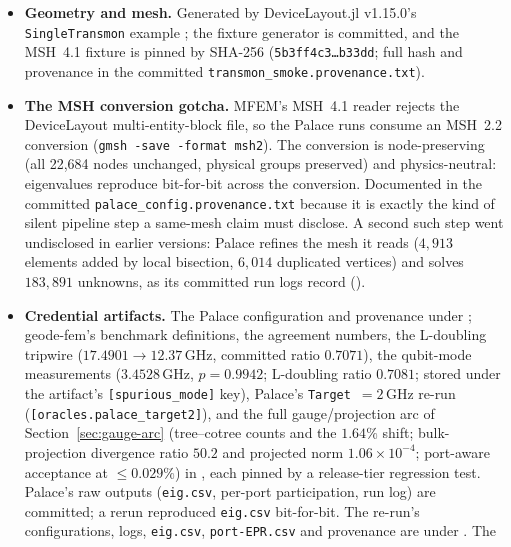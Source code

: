 \documentclass{anvil-paper}
\begin{document}
\begin{itemize}
  \item \textbf{Geometry and mesh.} Generated by DeviceLayout.jl
    v1.15.0's \texttt{SingleTransmon} example \citep{devicelayout}; the
    fixture generator is committed, and the MSH~4.1 fixture is pinned by
    SHA-256 (\texttt{5b3ff4c3\ldots{}b33dd}; full hash and provenance in
    the committed \texttt{transmon\_smoke.provenance.txt}).
  \item \textbf{The MSH conversion gotcha.} MFEM's MSH~4.1 reader
    rejects the DeviceLayout multi-entity-block file, so the Palace runs
    consume an MSH~2.2 conversion (\texttt{gmsh -save -format msh2}).
    The conversion is node-preserving (all 22{,}684 nodes unchanged,
    physical groups preserved) and physics-neutral: eigenvalues
    reproduce bit-for-bit across the conversion. Documented in the
    committed \texttt{palace\_config.provenance.txt} because it is
    exactly the kind of silent pipeline step a same-mesh claim must
    disclose. A second such step went undisclosed in earlier versions:
    Palace refines the mesh it reads ($4{,}913$ elements added by local
    bisection, $6{,}014$ duplicated vertices) and solves $183{,}891$
    unknowns, as its committed run logs record
    ().
  \item \textbf{Credential artifacts.} The Palace configuration and
    provenance under ;
    geode-fem's benchmark definitions, the agreement numbers, the
    L-doubling tripwire ($17.4901 \to 12.37$\,GHz, committed ratio
    $0.7071$), the qubit-mode measurements ($3.4528$\,GHz,
    $p = 0.9942$; L-doubling ratio $0.7081$; stored under the
    artifact's \texttt{[spurious\_mode]} key), Palace's
    \texttt{Target}~$= 2$\,GHz re-run
    (\texttt{[oracles.palace\_target2]}), and the full
    gauge/projection arc of Section~\ref{sec:gauge-arc}
    (tree--cotree counts and the $1.64\%$ shift; bulk-projection
    divergence ratio $50.2$ and projected norm $1.06\times10^{-4}$;
    port-aware acceptance at $\leq 0.029\%$) in
    , each pinned by a
    release-tier regression test. Palace's raw outputs
    (\texttt{eig.csv}, per-port participation, run log) are committed;
    a rerun reproduced \texttt{eig.csv} bit-for-bit. The re-run's
    configurations, logs, \texttt{eig.csv}, \texttt{port-EPR.csv} and
    provenance are under
    . The

\end{itemize}
\end{document}
